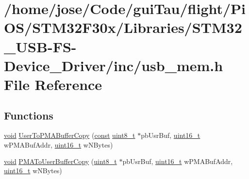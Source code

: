 \hypertarget{_s_t_m32_f30x_2_libraries_2_s_t_m32___u_s_b-_f_s-_device___driver_2inc_2usb__mem_8h}{\section{/home/jose/\-Code/gui\-Tau/flight/\-Pi\-O\-S/\-S\-T\-M32\-F30x/\-Libraries/\-S\-T\-M32\-\_\-\-U\-S\-B-\/\-F\-S-\/\-Device\-\_\-\-Driver/inc/usb\-\_\-mem.h File Reference}
\label{_s_t_m32_f30x_2_libraries_2_s_t_m32___u_s_b-_f_s-_device___driver_2inc_2usb__mem_8h}
}
\subsection*{Functions}
\begin{DoxyCompactItemize}
\item 
\hyperlink{group___n_a_m_e_ga18028b8badbf1ea7e704ccac3c488e82}{void} \hyperlink{_s_t_m32_f30x_2_libraries_2_s_t_m32___u_s_b-_f_s-_device___driver_2inc_2usb__mem_8h_a7e80055e83c3a7bf6229e0ff48c8bbc5}{User\-To\-P\-M\-A\-Buffer\-Copy} (\hyperlink{group___n_a_m_e_ga7ae6d0e43244213b34de2c2b9aa30da6}{const} \hyperlink{stdint_8h_aba7bc1797add20fe3efdf37ced1182c5}{uint8\-\_\-t} $\ast$pb\-Usr\-Buf, \hyperlink{stdint_8h_a273cf69d639a59973b6019625df33e30}{uint16\-\_\-t} w\-P\-M\-A\-Buf\-Addr, \hyperlink{stdint_8h_a273cf69d639a59973b6019625df33e30}{uint16\-\_\-t} w\-N\-Bytes)
\item 
\hyperlink{group___n_a_m_e_ga18028b8badbf1ea7e704ccac3c488e82}{void} \hyperlink{_s_t_m32_f30x_2_libraries_2_s_t_m32___u_s_b-_f_s-_device___driver_2inc_2usb__mem_8h_ab6dd9414600ffbf779acfc5266f59353}{P\-M\-A\-To\-User\-Buffer\-Copy} (\hyperlink{stdint_8h_aba7bc1797add20fe3efdf37ced1182c5}{uint8\-\_\-t} $\ast$pb\-Usr\-Buf, \hyperlink{stdint_8h_a273cf69d639a59973b6019625df33e30}{uint16\-\_\-t} w\-P\-M\-A\-Buf\-Addr, \hyperlink{stdint_8h_a273cf69d639a59973b6019625df33e30}{uint16\-\_\-t} w\-N\-Bytes)
\end{DoxyCompactItemize}


